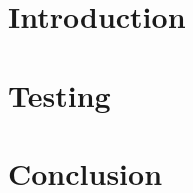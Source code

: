\documentclass[]{auvsi_doc}
\begin{document}
\begin{AUVSITitlePage}
\begin{artifacttable}
\end{artifacttable}
\end{AUVSITitlePage}

\section{Introduction}


\section{Testing}


\section{Conclusion}
\end{document}
